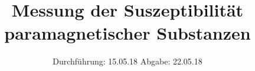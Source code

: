 

\subject{V606}
\title{Messung der Suszeptibilität paramagnetischer Substanzen }
\date{
  Durchführung: 15.05.18
  \hspace{3em}
  Abgabe: 22.05.18
}



\maketitle
\thispagestyle{empty}
\tableofcontents
\newpage








\newpage
\printbibliography


